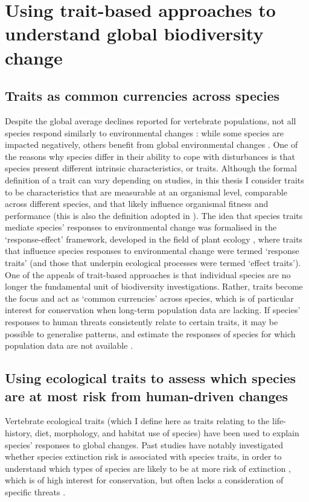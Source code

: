 \section{Using trait-based approaches to understand global biodiversity change}

\subsection{Traits as common currencies across species}

Despite the global average declines reported for vertebrate populations, not all species respond similarly to environmental changes \citep{Dornelas2019, Leung2020}: while some species are impacted negatively, others benefit from global environmental changes \citep{Thomas2013, Newbold2018a}. One of the reasons why species differ in their ability to cope with disturbances is that species present different intrinsic characteristics, or traits. Although the formal definition of a trait can vary depending on studies, in this thesis I consider traits to be characteristics that are measurable at an organismal level, comparable across different species, and that likely influence organismal fitness and performance (this is also the definition adopted in \citet{McGill2006}). The idea that species traits mediate species' responses to environmental change was formalised in the `response-effect' framework, developed in the field of plant ecology \citep{Lavorel2002a}, where traits that influence species responses to environmental change were termed `response traits' (and those that underpin ecological processes were termed `effect traits'). One of the appeals of trait-based approaches is that individual species are no longer the fundamental unit of biodiversity investigations. Rather, traits become the focus and act as `common currencies' across species, which is of particular interest for conservation when long-term population data are lacking. If species’ responses to human threats consistently relate to certain traits, it may be possible to generalise patterns, and estimate the responses of species for which population data are not available \citep{Verberk2013}. 

\subsection{Using ecological traits to assess which species are at most risk from human-driven changes}

Vertebrate ecological traits (which I define here as traits relating to the life-history, diet, morphology, and habitat use of species) have been used to explain species' responses to global changes. Past studies have notably investigated whether species extinction risk is associated with species traits, in order to understand which types of species are likely to be at more risk of extinction \citep{Lebreton2011, Ripple2017, Chichorro2019}, which is of high interest for conservation, but often lacks a consideration of specific threats \citep{GonzalezSuarez2013}. 

